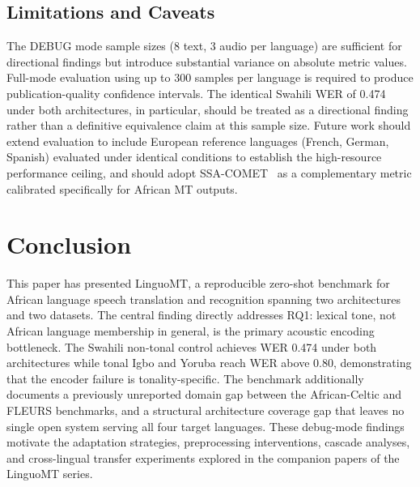 \documentclass[10pt,twocolumn]{article}
\begin{document}
\subsection{Limitations and Caveats}

The DEBUG mode sample sizes (8 text, 3 audio per language)
are sufficient for directional findings but introduce substantial
variance on absolute metric values.
Full-mode evaluation using up to 300 samples per language is
required to produce publication-quality confidence intervals.
The identical Swahili WER of 0.474 under both architectures,
in particular, should be treated as a directional finding rather
than a definitive equivalence claim at this sample size.
Future work should extend evaluation to include European reference
languages (French, German, Spanish) evaluated under identical
conditions to establish the high-resource performance ceiling,
and should adopt SSA-COMET~\cite{li2025ssacomet} as a
complementary metric calibrated specifically for African MT outputs.

\section{Conclusion}

This paper has presented LinguoMT, a reproducible zero-shot
benchmark for African language speech translation and recognition
spanning two architectures and two datasets.
The central finding directly addresses RQ1: lexical tone, not
African language membership in general, is the primary acoustic
encoding bottleneck.
The Swahili non-tonal control achieves WER 0.474 under both
architectures while tonal Igbo and Yoruba reach WER above 0.80,
demonstrating that the encoder failure is tonality-specific.
The benchmark additionally documents a previously unreported
domain gap between the African-Celtic and FLEURS benchmarks,
and a structural architecture coverage gap that leaves no single
open system serving all four target languages.
These debug-mode findings motivate the adaptation strategies,
preprocessing interventions, cascade analyses, and cross-lingual
transfer experiments explored in the companion papers of the
LinguoMT series.
\end{document}
